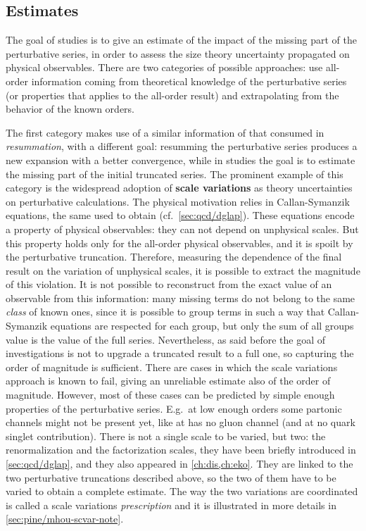 \subsection{Estimates}
\label{sec:pine/mhou-estimate}

The goal of \mhou studies is to give an estimate of the impact of the missing
part of the perturbative series, in order to assess the size theory uncertainty
propagated on physical observables.
%
There are two categories of possible approaches: use all-order information
coming from theoretical knowledge of the perturbative series (or properties
that applies to the all-order result) and extrapolating from the behavior of
the known orders.

The first category makes use of a similar information of that consumed in
\textit{resummation}, with a different goal: resumming the perturbative series
produces a new expansion with a better convergence, while in \mhou studies the
goal is to estimate the missing part of the initial truncated series.
%
The prominent example of this category is the widespread adoption of
\textbf{scale variations} as theory uncertainties on perturbative calculations.
The physical motivation relies in Callan-Symanzik equations, the same used to
obtain \dglap (cf.\ \cref{sec:qcd/dglap}).
%
These equations encode a property of physical observables: they can not depend
on unphysical scales.
But this property holds only for the all-order physical observables, and it is
spoilt by the perturbative truncation.
Therefore, measuring the dependence of the final result on the variation of
unphysical scales, it is possible to extract the magnitude of this violation. 
%
It is not possible to reconstruct from the exact value of an observable from
this information: many missing terms do not belong to the same \textit{class}
of known ones, since it is possible to group terms in such a way that
Callan-Symanzik equations are respected for each group, but only the sum of all
groups value is the value of the full series.
%
Nevertheless, as said before the goal of \mhou investigations is not to upgrade
a truncated result to a full one, so capturing the order of magnitude is
sufficient.
%
There are cases in which the scale variations approach is known to fail, giving
an unreliable estimate also of the order of magnitude.
However, most of these cases can be predicted by simple enough properties of
the perturbative series.
E.g.\ at low enough orders some partonic channels might not be present yet,
like \dis at \lo has no gluon channel (and at \nlo no quark singlet
contribution).
%
There is not a single scale to be varied, but two: the renormalization and the
factorization scales, they have been briefly introduced in
\cref{sec:qcd/dglap}, and they also appeared in \cref{ch:dis,ch:eko}.
They are linked to the two perturbative truncations described above, so the two
of them have to be varied to obtain a complete estimate.
The way the two variations are coordinated is called a scale variations
\textit{prescription} and it is illustrated in more details in
\cref{sec:pine/mhou-scvar-note}. 

